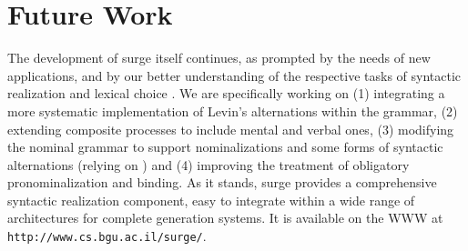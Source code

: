 \section{Future Work}

The development of {\sc surge} itself continues, as prompted by the needs
of new applications, and by our better understanding of the respective
tasks of syntactic realization and lexical choice \cite{elhadad-et-al96}.
We are specifically working on (1) integrating a more systematic
implementation of Levin's alternations within the grammar, (2) extending
composite processes to include mental and verbal ones, (3) modifying the
nominal grammar to support nominalizations and some forms of syntactic
alternations (relying on \cite{fries}) and (4) improving the treatment of
obligatory pronominalization and binding.
As it stands, {\sc surge} provides a comprehensive syntactic realization
component, easy to integrate within a wide range of architectures for
complete generation systems.  It is available on the WWW at {\tt
  http://www.cs.bgu.ac.il/surge/}.











